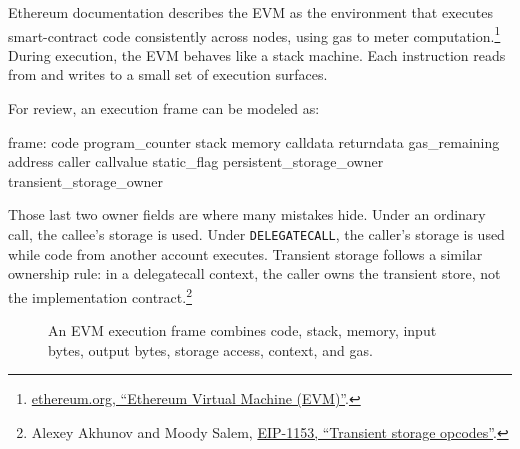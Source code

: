 Ethereum documentation describes the EVM as the environment that executes smart-contract code consistently across nodes, using gas to meter computation.\footnote{\href{https://ethereum.org/developers/docs/evm/}{ethereum.org, ``Ethereum Virtual Machine (EVM)''}.} During execution, the EVM behaves like a stack machine. Each instruction reads from and writes to a small set of execution surfaces.

For review, an execution frame can be modeled as:

\begin{codeblock}
frame:
    code
    program_counter
    stack
    memory
    calldata
    returndata
    gas_remaining
    address
    caller
    callvalue
    static_flag
    persistent_storage_owner
    transient_storage_owner
\end{codeblock}

Those last two owner fields are where many mistakes hide. Under an ordinary call, the callee's storage is used. Under \texttt{DELEGATECALL}, the caller's storage is used while code from another account executes. Transient storage follows a similar ownership rule: in a delegatecall context, the caller owns the transient store, not the implementation contract.\footnote{Alexey Akhunov and Moody Salem, \href{https://eips.ethereum.org/EIPS/eip-1153}{EIP-1153, ``Transient storage opcodes''}.}

\begin{figure}[htbp]
\centering
{}
\caption{An EVM execution frame combines code, stack, memory, input bytes, output bytes, storage access, context, and gas.}
\end{figure}


